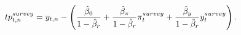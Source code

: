 \begin{equation} \label{eq:nTPsurvey}
	tp^{survey}_{t,n} = y_{t,n} - \left( \frac{\hat{\beta}_{0}}{1-\hat{\beta}_{r}} + \frac{\hat{\beta}_{{\pi}}}{1-\hat{\beta}_{r}} \pi^{survey}_{t} + \frac{\hat{\beta}_{{y}}}{1-\hat{\beta}_{r}} y^{survey}_{t} \right).
\end{equation}